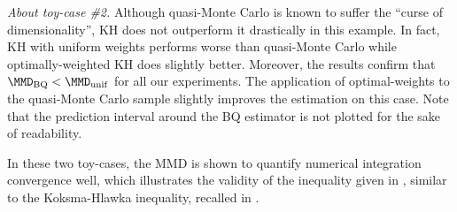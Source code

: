 \smallskip
\noindent\emph{About toy-case \#2.} Although quasi-Monte Carlo is known to suffer the ``curse of dimensionality'', KH does not outperform it drastically in this example. 
In fact, KH with uniform weights performs worse than quasi-Monte Carlo while optimally-weighted KH does slightly better. 
Moreover, the results confirm that $\MMD_{\mathrm{BQ}}< \MMD_{\mathrm{unif}}$ for all our experiments. 
The application of optimal-weights to the quasi-Monte Carlo sample slightly improves the estimation on this case. 
Note that the prediction interval around the BQ estimator is not plotted for the sake of readability. 
\smallskip

In these two toy-cases, the MMD is shown to quantify numerical integration convergence well, which illustrates the validity of the inequality given in , similar to the Koksma-Hlawka inequality, recalled in .

